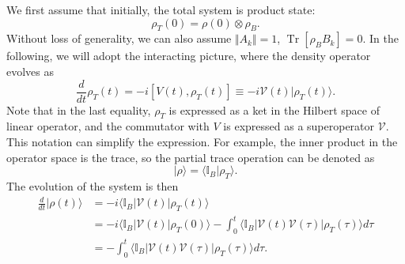 \documentclass[aps,prb,superscriptaddress,nofootinbib]{revtex4}
\def \Tr{\operatorname{Tr}}
\begin{document}
We first assume that initially, the total system is product state:
\begin{equation}
	\rho_T(0) = \rho(0) \otimes \rho_B.
\end{equation}
Without loss of generality, we can also assume $\Vert A_k \Vert =1$, $\Tr[\rho_B B_k]=0$.
In the following, we will adopt the interacting picture, where the density operator evolves as
\begin{equation}
	\frac{d}{dt} \rho_T(t) = -i[V(t), \rho_T(t)] \equiv -i\mathcal V(t) |\rho_T(t) \rangle.
\end{equation}
Note that in the last equality, $\rho_T$ is expressed as a ket in the Hilbert space of linear operator, and the commutator with $V$ is expressed as a superoperator $\mathcal V$.
This notation can simplify the expression.
For example, the inner product in the operator space is the trace, so the partial trace operation can be denoted as
\begin{equation}
	|\rho\rangle = \langle \mathbb I_B|\rho_T\rangle.
\end{equation}
The evolution of the system is then 
\begin{equation}
\begin{aligned}
	\frac{d}{dt} |\rho(t)\rangle &= -i \langle \mathbb I_B|\mathcal V(t) |\rho_T(t)\rangle \\
	&= -i \langle \mathbb I_B|\mathcal{V}(t) |\rho_T(0)\rangle - \int_0^t \langle \mathbb I_B| \mathcal{V}(t) \mathcal{V}(\tau) |\rho_T(\tau)\rangle d\tau \\
	&= - \int_0^t \langle \mathbb I_B| \mathcal{V}(t) \mathcal{V}(\tau) |\rho_T(\tau)\rangle d\tau.
\end{aligned}
\end{equation}
\end{document}

